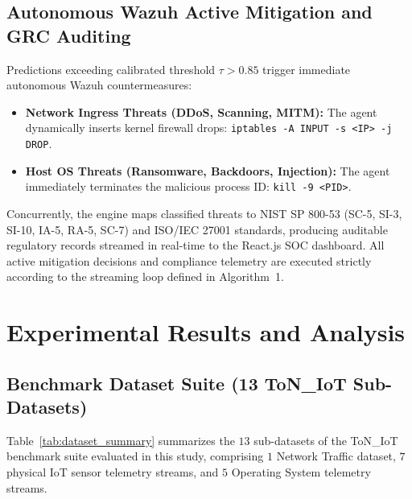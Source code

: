 \documentclass[11pt,a4paper]{article}
\begin{document}
\subsection{Autonomous Wazuh Active Mitigation and GRC Auditing}
Predictions exceeding calibrated threshold $\tau > 0.85$ trigger immediate autonomous Wazuh countermeasures:
\begin{itemize}
    \item \textbf{Network Ingress Threats (DDoS, Scanning, MITM):} The agent dynamically inserts kernel firewall drops: \texttt{iptables -A INPUT -s <IP> -j DROP}.
    \item \textbf{Host OS Threats (Ransomware, Backdoors, Injection):} The agent immediately terminates the malicious process ID: \texttt{kill -9 <PID>}.
\end{itemize}
Concurrently, the engine maps classified threats to NIST SP 800-53 (SC-5, SI-3, SI-10, IA-5, RA-5, SC-7) and ISO/IEC 27001 standards, producing auditable regulatory records streamed in real-time to the React.js SOC dashboard. All active mitigation decisions and compliance telemetry are executed strictly according to the streaming loop defined in Algorithm~1.

\section{Experimental Results and Analysis}
\label{sec:results}

\subsection{Benchmark Dataset Suite (13 ToN\_IoT Sub-Datasets)}
Table~\ref{tab:dataset_summary} summarizes the $13$ sub-datasets of the ToN\_IoT benchmark suite evaluated in this study, comprising $1$ Network Traffic dataset, $7$ physical IoT sensor telemetry streams, and $5$ Operating System telemetry streams.
\end{document}
